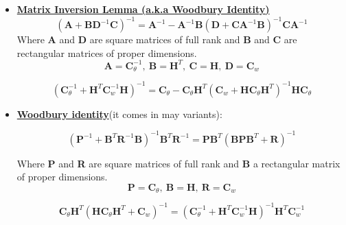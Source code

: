 \begin{itemize}
\begin{align*}
\boldsymbol{\eta}_{\boldsymbol{\theta}\mid\mathbf{Y}}
&= \boldsymbol{\eta}_\theta
   + \left(\mathbf{C}_\theta^{-1}
           + \mathbf{H}^{T}\mathbf{C}_W^{-1}\mathbf{H}\right)^{-1}
     \mathbf{H}^{T}\mathbf{C}_W^{-1}
     (\mathbf{Y}-\mathbf{H}\boldsymbol{\eta}_\theta), \\[10pt]
\mathbf{C}_{\boldsymbol{\theta}\mid\mathbf{Y}}
&= \left(\mathbf{C}_\theta^{-1}
         + \mathbf{H}^{T}\mathbf{C}_W^{-1}\mathbf{H}\right)^{-1}.
\end{align*}
\item \underline{\textbf{Matrix Inversion Lemma (a.k.a Woodbury Identity)}}
\[
\left( \mathbf{A} + \mathbf{B}\mathbf{D}^{-1}\mathbf{C} \right)^{-1}
= \mathbf{A}^{-1} - \mathbf{A}^{-1}\mathbf{B}
\left( \mathbf{D} + \mathbf{C}\mathbf{A}^{-1}\mathbf{B} \right)^{-1}
\mathbf{C}\mathbf{A}^{-1}
\]
\noindent Where \textbf{A} and \textbf{D} are square matrices of full rank and \textbf{B} and \textbf{C} are rectangular matrices of proper dimensions.
$$\mathbf{A} = \mathbf{C}_\theta^{-1},\ \mathbf{B} = \mathbf{H}^T,\ \mathbf{C} = \mathbf{H},\ \mathbf{D} = \mathbf{C}_w$$

$$\left( \mathbf{C}_\theta^{-1} + \mathbf{H}^T \mathbf{C}_w^{-1} \mathbf{H} \right)^{-1}
= \mathbf{C}_\theta - \mathbf{C}_\theta \mathbf{H}^T \left( \mathbf{C}_w + \mathbf{H} \mathbf{C}_\theta \mathbf{H}^T \right)^{-1} \mathbf{H} \mathbf{C}_\theta$$

\item \underline{\textbf{Woodbury identity}}(it comes in may variants):

$$\left( \mathbf{P}^{-1} + \mathbf{B}^T \mathbf{R}^{-1} \mathbf{B} \right)^{-1} \mathbf{B}^T \mathbf{R}^{-1}
= \mathbf{P} \mathbf{B}^T \left( \mathbf{B} \mathbf{P} \mathbf{B}^T + \mathbf{R} \right)^{-1}$$


\noindent Where \textbf{P} and \textbf{R} are square matrices of full rank and \textbf{B} a rectangular matrix of proper dimensions.
$$\mathbf{P} = \mathbf{C}_\theta,\ \mathbf{B} = \mathbf{H},\ \mathbf{R} = \mathbf{C}_w$$

$$\mathbf{C}_\theta \mathbf{H}^T \left( \mathbf{H} \mathbf{C}_\theta \mathbf{H}^T + \mathbf{C}_w \right)^{-1}
= \left( \mathbf{C}_\theta^{-1} + \mathbf{H}^T \mathbf{C}_w^{-1} \mathbf{H} \right)^{-1} \mathbf{H}^T \mathbf{C}_w^{-1}$$


\end{itemize}
